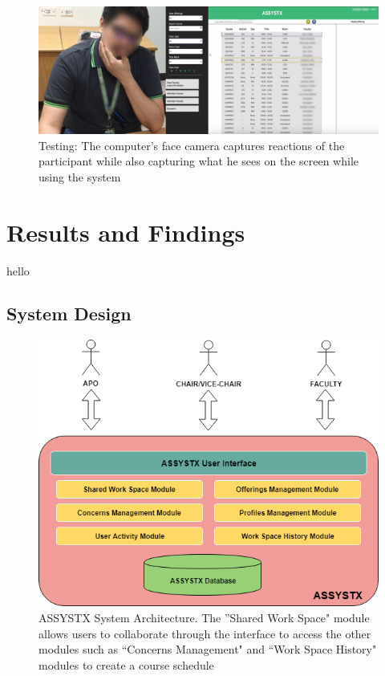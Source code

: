 \begin{figure}[]
\centering
   \includegraphics[scale=1.5,keepaspectratio]{PCSC2019_latex/Tests/sirTighe.png}
   \caption{Testing: The computer's face camera captures reactions of the participant while also capturing what he sees on the screen while using the system}
    \label{fig:cvc_testing}
\end{figure}

\section{Results and Findings}
hello
\subsection{System Design}

\begin{figure}[h]
   \centering
   \includegraphics[scale=0.4]{Diagrams/System_Architecture.png}
   \caption{ASSYSTX System Architecture. The ''Shared Work Space" module allows users to collaborate through the interface to access the other modules such as ``Concerns Management" and ``Work Space History" modules to create a course schedule}
    \label{fig:pipelinediagram}
\end{figure}

